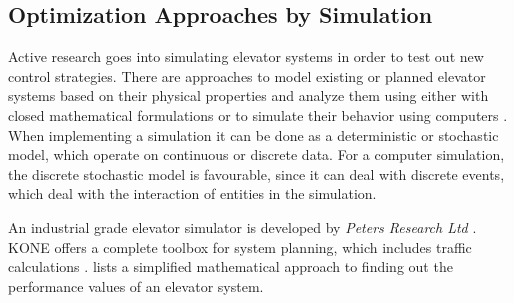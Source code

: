 \subsection{Optimization Approaches by Simulation}

Active research goes into simulating elevator systems in order to test out new control strategies.
There are approaches to model existing or planned elevator systems based on their physical properties
and analyze them using either with closed mathematical formulations or to simulate their behavior using computers \autocite[][p.~6]{beers2015arrivals}. 
When implementing a simulation it can be done as a deterministic or stochastic model, which operate on continuous or discrete data.
For a computer simulation, the discrete stochastic model is favourable, 
since it can deal with discrete events, which deal with the interaction of entities in the simulation. 

An industrial grade elevator simulator is developed by \emph{Peters Research Ltd} \autocite[][]{peters2018elevate}.
KONE offers a complete toolbox for system planning, which includes traffic calculations \autocite[][]{kone2016toolbox}.
\textcite[][p.~193]{unger2015aufzuege} lists a simplified mathematical approach to finding out the performance values of an elevator system.
